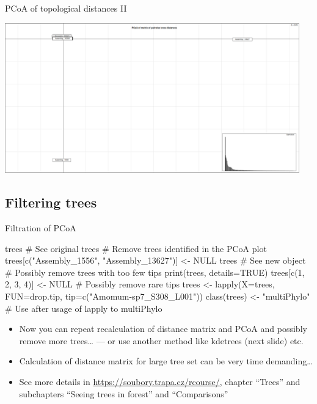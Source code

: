 \documentclass[compress,  xelatex, 11pt, xcolor=x11names, aspectratio=169,
	hyperref={
		bookmarks=true,
		unicode=true,
		colorlinks=true,
		pdftitle={HybSeq course},
		plainpages=false,
		pdfauthor={Vojtech Zeisek},
		pdfsubject={Practical processing of HybSeq target enrichment sequencing data on computing grids like MetaCentrum},
		pdfcreator={XeLaTeX},
		pdfkeywords={BASH, command line, GNU, HybSeq, Linux, MetaCentrum, sequencing shell, target enrichment},
		linkcolor=Turquoise4, %
		anchorcolor=DodgerBlue4, %
		citecolor=DodgerBlue4, %
		filecolor=DodgerBlue4, %
		menucolor=Tan4, %
		urlcolor=DarkOliveGreen4 %
		},
	url={hyphens, lowtilde} %
	]{beamer}
\begin{document}
\begin{frame}{PCoA of topological distances II}
	\begin{center}
		\includegraphics[height=6.5cm]{pcoa.png}
	\end{center}
\end{frame}

\subsection{Filtering trees}

\begin{frame}[fragile]{Filtration of PCoA}
	\begin{spluscode}
    trees # See original trees
    # Remove trees identified in the PCoA plot
    trees[c("Assembly_1556", "Assembly_13627")] <- NULL
    trees # See new object
    # Possibly remove trees with too few tips
    print(trees, details=TRUE)
    trees[c(1, 2, 3, 4)] <- NULL
    # Possibly remove rare tips
    trees <- lapply(X=trees, FUN=drop.tip, tip=c("Amomum-sp7_S308_L001"))
    class(trees) <- "multiPhylo" # Use after usage of lapply to multiPhylo
	\end{spluscode}
	\begin{itemize}
		\item Now you can repeat recalculation of distance matrix and PCoA and possibly remove more trees\ldots{ }--- or use another method like kdetrees (next slide) etc.
		\item Calculation of distance matrix for large tree set can be very time demanding\ldots
		\item See more details in \url{https://soubory.trapa.cz/rcourse/}, chapter \enquote{Trees} and subchapters \enquote{Seeing trees in forest} and \enquote{Comparisons}
	\end{itemize}
\end{frame}
\end{document}
